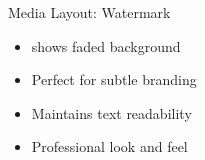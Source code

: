 \documentclass[aspectratio=169]{beamer}
\begin{document}
\begin{frame}{Media Layout: Watermark}
    \begin{itemize}
        \item {} shows faded background
        \item Perfect for subtle branding
        \item Maintains text readability
        \item Professional look and feel
    \end{itemize}
\end{frame}
\end{document}
